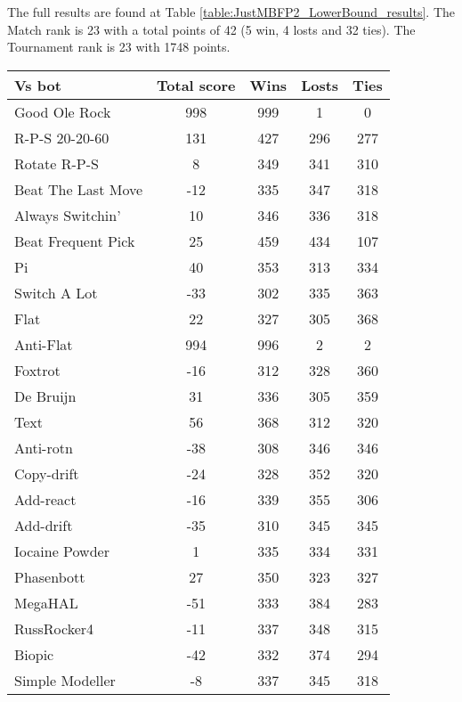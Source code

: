 The full results are found at Table \ref{table:JustMBFP2_LowerBound_results}. The Match rank is 23 with a total points of 42 (5 win, 4 losts and 32 ties). The Tournament rank is 23 with 1748 points.

\begin{table*}
    \caption{JustMBFP2_LowerBound results}
    \label{table:JustMBFP2_LowerBound_results}
    \centering
    \begin{tabular}{|l|c|c|c|c|}
        \hline
        \textbf{Vs bot} & \textbf{Total score} & \textbf{Wins} & \textbf{Losts} & \textbf{Ties} \\ \hline
Good Ole Rock & 998 & 999 & 1 & 0 \\ \hline 
R-P-S 20-20-60 & 131 & 427 & 296 & 277 \\ \hline 
Rotate R-P-S & 8 & 349 & 341 & 310 \\ \hline 
Beat The Last Move & -12 & 335 & 347 & 318 \\ \hline 
Always Switchin' & 10 & 346 & 336 & 318 \\ \hline 
Beat Frequent Pick & 25 & 459 & 434 & 107 \\ \hline 
Pi & 40 & 353 & 313 & 334 \\ \hline 
Switch A Lot & -33 & 302 & 335 & 363 \\ \hline 
Flat & 22 & 327 & 305 & 368 \\ \hline 
Anti-Flat & 994 & 996 & 2 & 2 \\ \hline 
Foxtrot & -16 & 312 & 328 & 360 \\ \hline 
De Bruijn & 31 & 336 & 305 & 359 \\ \hline 
Text & 56 & 368 & 312 & 320 \\ \hline 
Anti-rotn & -38 & 308 & 346 & 346 \\ \hline 
Copy-drift & -24 & 328 & 352 & 320 \\ \hline 
Add-react & -16 & 339 & 355 & 306 \\ \hline 
Add-drift & -35 & 310 & 345 & 345 \\ \hline 
Iocaine Powder & 1 & 335 & 334 & 331 \\ \hline 
Phasenbott & 27 & 350 & 323 & 327 \\ \hline 
MegaHAL & -51 & 333 & 384 & 283 \\ \hline 
RussRocker4 & -11 & 337 & 348 & 315 \\ \hline 
Biopic & -42 & 332 & 374 & 294 \\ \hline 
Simple Modeller & -8 & 337 & 345 & 318 \\ \hline 

\end{tabular}
\end{table*}
